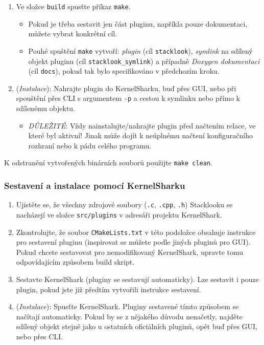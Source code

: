 \begin{enumerate}
  \item Ve složce \texttt{build} spusťte příkaz \texttt{make}.
    \begin{itemize}
      \item Pokud je třeba sestavit jen část pluginu, napříkla pouze dokumentaci, můžete vybrat konkrétní cíl.
      \item Pouhé spuštění \texttt{make} vytvoří: \emph{plugin} (cíl \texttt{stacklook}), \emph{symlink} na sdílený objekt pluginu (cíl \texttt{stacklook\_symlink}) a případně \emph{Doxygen dokumentaci} (cíl \texttt{docs}), pokud tak bylo specifikováno v předchozím kroku.
    \end{itemize}
  \item (\emph{Instalace}): Nahrajte plugin do KernelSharku, buď přes GUI, nebo při spouštění přes CLI s argumentem \texttt{-p} a cestou k symlinku nebo přímo k sdílenému objektu.
    \begin{itemize}
      \item \emph{DŮLEŽITÉ}: Vždy nainstalujte/nahrajte plugin před načtením relace, ve které byl aktivní! Jinak může dojít k neúplnému načtení konfiguračního rozhraní nebo k pádu celého programu.
    \end{itemize}
\end{enumerate}

K odstranění vytvořených binárních souborů použijte \texttt{make clean}.

\subsubsection{Sestavení a instalace pomocí KernelSharku}

\begin{enumerate}
  \item Ujistěte se, že všechny zdrojové soubory (\texttt{.c}, \texttt{.cpp}, \texttt{.h}) Stacklooku se nacházejí ve složce \texttt{src/plugins} v adresáři projektu KernelShark.
  \item Zkontrolujte, že soubor \texttt{CMakeLists.txt} v této podsložce obsahuje instrukce pro sestavení pluginu (inspirovat se můžete podle jiných pluginů pro GUI). Pokud chcete sestavovat pro nemodifikovaný KernelShark, upravte tomu odpovídajícím způsobem build skript.
  \item Sestavte KernelShark (pluginy se sestavují automaticky). Lze sestavit i pouze plugin, pokud jste již předtím vytvořili instrukce sestavení.
  \item (\emph{Instalace}): Spusťte KernelShark. Pluginy sestavené tímto způsobem se načítají automaticky. Pokud by se z nějakého důvodu nenačetly, najděte sdílený objekt stejně jako u ostatních oficiálních pluginů, opět buď přes GUI, nebo přes CLI.
\end{enumerate}

